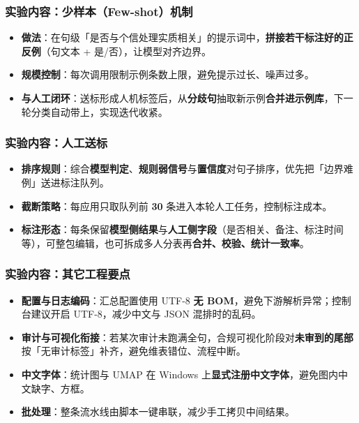 \documentclass[AutoFakeBold,AutoFakeSlant]{beamer}
\begin{document}
\begin{frame}
    \frametitle{实验内容：少样本（Few-shot）机制}
    \begin{itemize}
        \item \textbf{做法}：在句级「是否与个信处理实质相关」的提示词中，\textbf{拼接若干标注好的正反例}（句文本 + 是/否），让模型对齐边界。
        \item \textbf{规模控制}：每次调用限制示例条数上限，避免提示过长、噪声过多。
        \item \textbf{与人工闭环}：送标形成人机标签后，从\textbf{分歧句}抽取新示例\textbf{合并进示例库}，下一轮分类自动带上，实现迭代收紧。
    \end{itemize}
\end{frame}

\begin{frame}
    \frametitle{实验内容：人工送标}
    \begin{itemize}
        \item \textbf{排序规则}：综合\textbf{模型判定}、\textbf{规则弱信号}与\textbf{置信度}对句子排序，优先把「边界难例」送进标注队列。
        \item \textbf{截断策略}：每应用只取队列前 \textbf{30} 条进入本轮人工任务，控制标注成本。
        \item \textbf{标注形态}：每条保留\textbf{模型侧结果}与\textbf{人工侧字段}（是否相关、备注、标注时间等），可整包编辑，也可拆成多人分表再\textbf{合并、校验、统计一致率}。
    \end{itemize}
\end{frame}

\begin{frame}
    \frametitle{实验内容：其它工程要点}
    \begin{itemize}
        \item \textbf{配置与日志编码}：汇总配置使用 UTF-8 \textbf{无 BOM}，避免下游解析异常；控制台建议开启 UTF-8，减少中文与 JSON 混排时的乱码。
        \item \textbf{审计与可视化衔接}：若某次审计未跑满全句，合规可视化阶段对\textbf{未审到的尾部}按「无审计标签」补齐，避免维表错位、流程中断。
        \item \textbf{中文字体}：统计图与 UMAP 在 Windows 上\textbf{显式注册中文字体}，避免图内中文缺字、方框。
        \item \textbf{批处理}：整条流水线由脚本一键串联，减少手工拷贝中间结果。
    \end{itemize}
\end{frame}

\end{document}
